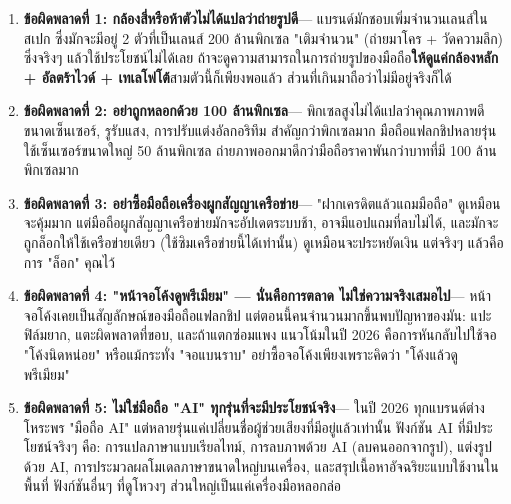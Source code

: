 
\begin{enumerate}
  \item \textbf{ข้อผิดพลาดที่ 1: กล้องสี่หรือห้าตัวไม่ได้แปลว่าถ่ายรูปดี}— แบรนด์มักชอบเพิ่มจำนวนเลนส์ในสเปก ซึ่งมักจะมีอยู่ 2 ตัวที่เป็นเลนส์ 200 ล้านพิกเซล "เติมจำนวน" (ถ่ายมาโคร + วัดความลึก) ซึ่งจริงๆ แล้วใช้ประโยชน์ไม่ได้เลย ถ้าจะดูความสามารถในการถ่ายรูปของมือถือ\textbf{ให้ดูแค่กล้องหลัก + อัลตร้าไวด์ + เทเลโฟโต้}สามตัวนี้ก็เพียงพอแล้ว ส่วนที่เกินมาถือว่าไม่มีอยู่จริงก็ได้
  \item \textbf{ข้อผิดพลาดที่ 2: อย่าถูกหลอกด้วย 100 ล้านพิกเซล}— พิกเซลสูงไม่ได้แปลว่าคุณภาพภาพดี ขนาดเซ็นเซอร์, รูรับแสง, การปรับแต่งอัลกอริทึม สำคัญกว่าพิกเซลมาก มือถือแฟลกชิปหลายรุ่นใช้เซ็นเซอร์ขนาดใหญ่ 50 ล้านพิกเซล ถ่ายภาพออกมาดีกว่ามือถือราคาพันกว่าบาทที่มี 100 ล้านพิกเซลมาก
  \item \textbf{ข้อผิดพลาดที่ 3: อย่าซื้อมือถือเครื่องผูกสัญญาเครือข่าย}— "ฝากเครดิตแล้วแถมมือถือ" ดูเหมือนจะคุ้มมาก แต่มือถือผูกสัญญาเครือข่ายมักจะอัปเดตระบบช้า, อาจมีแอปแถมที่ลบไม่ได้, และมักจะถูกล็อกให้ใช้เครือข่ายเดียว (ใช้ซิมเครือข่ายนี้ได้เท่านั้น) ดูเหมือนจะประหยัดเงิน แต่จริงๆ แล้วคือการ "ล็อก" คุณไว้
  \item \textbf{ข้อผิดพลาดที่ 4: "หน้าจอโค้งดูพรีเมียม" — นั่นคือการตลาด ไม่ใช่ความจริงเสมอไป}— หน้าจอโค้งเคยเป็นสัญลักษณ์ของมือถือแฟลกชิป แต่ตอนนี้คนจำนวนมากขึ้นพบปัญหาของมัน: แปะฟิล์มยาก, แตะผิดพลาดที่ขอบ, และถ้าแตกซ่อมแพง แนวโน้มในปี 2026 คือการหันกลับไปใช้จอ "โค้งนิดหน่อย" หรือแม้กระทั่ง "จอแบนราบ" อย่าซื้อจอโค้งเพียงเพราะคิดว่า "โค้งแล้วดูพรีเมียม"
  \item \textbf{ข้อผิดพลาดที่ 5: ไม่ใช่มือถือ "AI" ทุกรุ่นที่จะมีประโยชน์จริง}— ในปี 2026 ทุกแบรนด์ต่างโหระพร "มือถือ AI" แต่หลายรุ่นแค่เปลี่ยนชื่อผู้ช่วยเสียงที่มีอยู่แล้วเท่านั้น ฟังก์ชัน AI ที่มีประโยชน์จริงๆ คือ: การแปลภาษาแบบเรียลไทม์, การลบภาพด้วย AI (ลบคนออกจากรูป), แต่งรูปด้วย AI, การประมวลผลโมเดลภาษาขนาดใหญ่บนเครื่อง, และสรุปเนื้อหาอัจฉริยะแบบใช้งานในพื้นที่ ฟังก์ชันอื่นๆ ที่ดูโหวงๆ ส่วนใหญ่เป็นแค่เครื่องมือหลอกล่อ
\end{enumerate}


